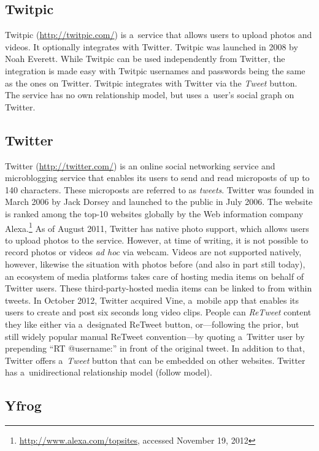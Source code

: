 \subsection{Twitpic}

Twitpic (\url{http://twitpic.com/})
is a~service that allows users to upload photos and videos.
It optionally integrates with Twitter.
Twitpic was launched in 2008 by Noah Everett.
While Twitpic can be used independently from Twitter,
the integration is made easy with Twitpic usernames and passwords
being the same as the ones on Twitter.
Twitpic integrates with Twitter via the \emph{Tweet} button.
The service has no own relationship model,
but uses a~user's social graph on Twitter.

\subsection{Twitter}
\label{sec:twitter}

Twitter (\url{http://twitter.com/})
is an online social networking service
and microblogging service
that enables its users to send and read microposts
of up to 140 characters.
These microposts are referred to as \emph{tweets}.
Twitter was founded in March 2006 by Jack Dorsey
and launched to the public in July 2006.
The website is ranked among the top-10 websites globally
by the Web information company
Alexa.\footnote{\url{http://www.alexa.com/topsites},
accessed November 19, 2012}
As of August 2011, Twitter has native photo support,
which allows users to upload photos to the service.
However, at time of writing, it is not possible to 
record photos or videos \emph{ad hoc} via webcam.
Videos are not supported natively, however,
likewise the situation with photos before
(and also in part still today),
an ecosystem of media platforms takes care of
hosting media items on behalf of Twitter users.
These third-party-hosted media items
can be linked to from within tweets.
In October 2012, Twitter acquired Vine,
a~mobile app that enables its users to create
and post six seconds long video clips.
People can \emph{ReTweet} content they like either
via a~designated ReTweet button,
or---following the prior, but still widely popular
manual ReTweet convention---by
quoting a~Twitter user by prepending ``RT @username:''
in front of the original tweet.
In addition to that, Twitter offers
a~\emph{Tweet} button that can be embedded on other websites.
Twitter has a~unidirectional relationship model (follow model).

\subsection{Yfrog}

